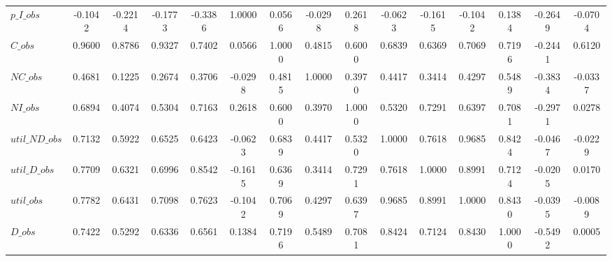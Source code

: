 \begin{center}
\begin{longtable}{lcccccccccccccc}
$p\_I\_obs      $	 & 	          -0.1042	 & 	          -0.2214	 & 	          -0.1773	 & 	          -0.3386	 & 	           1.0000	 & 	           0.0566	 & 	          -0.0298	 & 	           0.2618	 & 	          -0.0623	 & 	          -0.1615	 & 	          -0.1042	 & 	           0.1384	 & 	          -0.2649	 & 	          -0.0704 \\ 
$C\_obs         $	 & 	           0.9600	 & 	           0.8786	 & 	           0.9327	 & 	           0.7402	 & 	           0.0566	 & 	           1.0000	 & 	           0.4815	 & 	           0.6000	 & 	           0.6839	 & 	           0.6369	 & 	           0.7069	 & 	           0.7196	 & 	          -0.2441	 & 	           0.6120 \\ 
$NC\_obs        $	 & 	           0.4681	 & 	           0.1225	 & 	           0.2674	 & 	           0.3706	 & 	          -0.0298	 & 	           0.4815	 & 	           1.0000	 & 	           0.3970	 & 	           0.4417	 & 	           0.3414	 & 	           0.4297	 & 	           0.5489	 & 	          -0.3834	 & 	          -0.0337 \\ 
$NI\_obs        $	 & 	           0.6894	 & 	           0.4074	 & 	           0.5304	 & 	           0.7163	 & 	           0.2618	 & 	           0.6000	 & 	           0.3970	 & 	           1.0000	 & 	           0.5320	 & 	           0.7291	 & 	           0.6397	 & 	           0.7081	 & 	          -0.2971	 & 	           0.0278 \\ 
$util\_ND\_obs  $	 & 	           0.7132	 & 	           0.5922	 & 	           0.6525	 & 	           0.6423	 & 	          -0.0623	 & 	           0.6839	 & 	           0.4417	 & 	           0.5320	 & 	           1.0000	 & 	           0.7618	 & 	           0.9685	 & 	           0.8424	 & 	          -0.0467	 & 	          -0.0229 \\ 
$util\_D\_obs   $	 & 	           0.7709	 & 	           0.6321	 & 	           0.6996	 & 	           0.8542	 & 	          -0.1615	 & 	           0.6369	 & 	           0.3414	 & 	           0.7291	 & 	           0.7618	 & 	           1.0000	 & 	           0.8991	 & 	           0.7124	 & 	          -0.0205	 & 	           0.0170 \\ 
$util\_obs      $	 & 	           0.7782	 & 	           0.6431	 & 	           0.7098	 & 	           0.7623	 & 	          -0.1042	 & 	           0.7069	 & 	           0.4297	 & 	           0.6397	 & 	           0.9685	 & 	           0.8991	 & 	           1.0000	 & 	           0.8430	 & 	          -0.0395	 & 	          -0.0089 \\ 
$D\_obs         $	 & 	           0.7422	 & 	           0.5292	 & 	           0.6336	 & 	           0.6561	 & 	           0.1384	 & 	           0.7196	 & 	           0.5489	 & 	           0.7081	 & 	           0.8424	 & 	           0.7124	 & 	           0.8430	 & 	           1.0000	 & 	          -0.5492	 & 	           0.0005 \\ 

\end{longtable}
\end{center}
